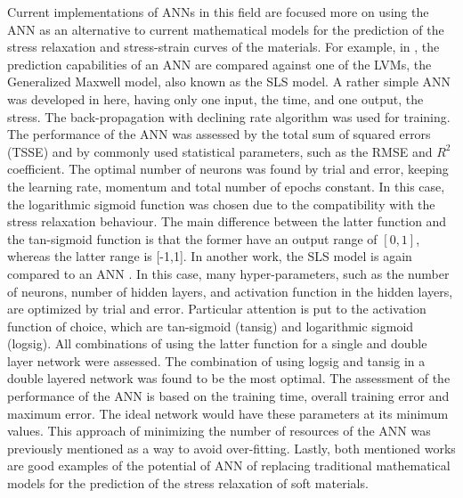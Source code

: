 Current implementations of ANNs in this field are focused more on using the ANN as an alternative to current mathematical models for the prediction of the stress relaxation and stress-strain curves of the materials. For example, in \cite{saeidirad2013predictions}, the prediction capabilities of an ANN are compared against one of the LVMs, the Generalized Maxwell model, also known as the SLS model. A rather simple ANN was developed in here, having only one input, the time, and one output, the stress. The back-propagation with declining rate algorithm was used for training. The performance of the ANN was assessed by the total sum of squared errors (TSSE) and by commonly used statistical parameters, such as the RMSE and $R^2$ coefficient. The optimal number of neurons was found by trial and error, keeping the learning rate, momentum and total number of epochs constant. In this case, the logarithmic sigmoid function was chosen due to the compatibility with the stress relaxation behaviour. The main difference between the latter function and the tan-sigmoid function is that the former have an output range of $[0,1]$, whereas the latter range is [-1,1]. In another work, the SLS model is again compared to an ANN \cite{gao2015viscoelastic}. In this case, many hyper-parameters, such as the number of neurons, number of hidden layers, and activation function in the hidden layers, are optimized by trial and error. Particular attention is put to the activation function of choice, which are tan-sigmoid (tansig) and logarithmic sigmoid (logsig). All combinations of using the latter function for a single and double layer network were assessed. The combination of using logsig and tansig in a double layered network was found to be the most optimal. The assessment of the performance of the ANN is based on the training time, overall training error and maximum error. The ideal network would have these parameters at its minimum values. This approach of minimizing the number of resources of the ANN was previously mentioned as a way to avoid over-fitting. Lastly, both mentioned works are good examples of the potential of ANN of replacing traditional mathematical models for the prediction of the stress relaxation of soft materials.

